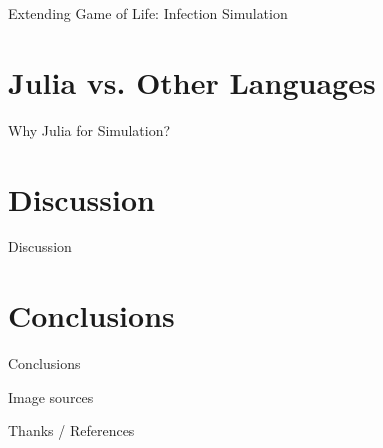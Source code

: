 \begin{frame}{Extending Game of Life: Infection Simulation}

\end{frame}


\section{Julia vs. Other Languages}
\begin{frame}{Why Julia for Simulation?}

\end{frame}


\section{Discussion}
\begin{frame}{Discussion}

\end{frame}


\section{Conclusions}
\begin{frame}{Conclusions}

\end{frame}

\begin{frame}{Image sources}

\end{frame}


\begin{frame}{Thanks / References}

\end{frame}
